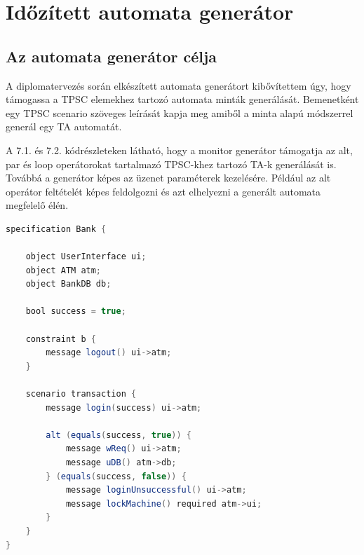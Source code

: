 \chapter{Időzített automata generátor}

\section{Az automata generátor célja}

A diplomatervezés során elkészített automata generátort kibővítettem úgy, hogy támogassa a TPSC elemekhez tartozó automata minták generálását. Bemenetként egy TPSC scenario szöveges leírását kapja meg amiből a minta alapú módszerrel generál egy TA automatát.

A 7.1. és 7.2. kódrészleteken látható, hogy a monitor generátor támogatja az alt, par és loop operátorokat tartalmazó TPSC-khez tartozó TA-k generálását is.
Továbbá a generátor képes az üzenet paraméterek kezelésére.
Például az alt operátor feltételét képes feldolgozni és azt elhelyezni a generált automata megfelelő élén.

\begin{lstlisting}[language=java,frame=single, float=h!, caption={Alt operátort tartalmazó scenario.},captionpos=b]
specification Bank {

	object UserInterface ui;
	object ATM atm;
	object BankDB db;

	bool success = true;

	constraint b {
		message logout() ui->atm;
	}

	scenario transaction {
		message login(success) ui->atm;

		alt (equals(success, true)) {
			message wReq() ui->atm;
			message uDB() atm->db;
		} (equals(success, false)) {
			message loginUnsuccessful() ui->atm;
			message lockMachine() required atm->ui;
		}
	}
}
\end{lstlisting}

